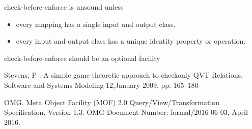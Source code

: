 \documentclass{llncs}
\begin{document}
check-before-enforce is unsound unless
\begin{itemize}
	\item every mapping has a single input and output class.
	\item every input and output class has a unique identity property or operation.
\end{itemize}
check-before-enforce should be an optional facility


%
%
\begin{thebibliography}{}

Stevens, P : A simple game-theoretic approach to checkonly QVT-Relations,
Software and Systems Modeling 12,January 2009, pp. 165–180

OMG. Meta Object Facility (MOF) 2.0 Query/View/Transformation Specification, Version 1.3.
OMG Document Number: formal/2016-06-03, April 2016.

\end{thebibliography}
\end{document}
